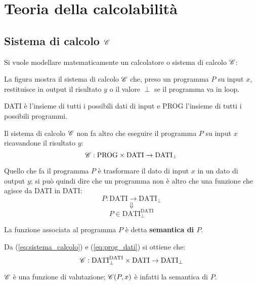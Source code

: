 \section{Teoria della calcolabilità}

\subsection{Sistema di calcolo \texorpdfstring{$\mathscr{C}$}{C}}
Si vuole modellare matematicamente un calcolatore o sistema di calcolo $\mathscr{C}$:
\vspace{.4cm}
\begin{figure}[h]
    \centering
    
\end{figure}

La figura mostra il sistema di calcolo $\mathscr{C}$ che, preso un programma $P$
su input $x$, restituisce in output il risultato $y$ o il valore $\perp$
se il programma va in loop.

DATI è l'insieme di tutti i possibili dati di input e PROG l'insieme di
tutti i possibili programmi.

Il sistema di calcolo $\mathscr{C}$ non fa altro che eseguire il programma $P$ su input
$x$ ricavandone il risultato $y$:
\begin{equation}\label{eq:sistema_calcolo}
\mathscr{C}:\text{PROG}\times\text{DATI}\rightarrow\text{DATI}_\perp
\end{equation}

Quello che fa il programma $P$ è trasformare il dato di input $x$ in un dato
di output $y$; si può quindi dire che un programma non è altro che
una funzione che agisce da DATI in DATI:
$$ P:\text{DATI} \rightarrow \text{DATI}_\perp $$
$$ \Downarrow $$
\begin{equation}\label{eq:prog_dati} P \in
\text{DATI}^{\text{DATI}}_\perp \end{equation}

La funzione associata al programma $P$ è detta \textbf{semantica di $P$}.

Da (\ref{eq:sistema_calcolo}) e (\ref{eq:prog_dati}) si ottiene che:
$$ \mathscr{C}:\text{DATI}^{\text{DATI}}_\perp\times\text{DATI}
\rightarrow\text{DATI}_\perp $$

$\mathscr{C}$ è una funzione di valutazione; $\mathscr{C}(P,x)$ è infatti la semantica di $P$.

